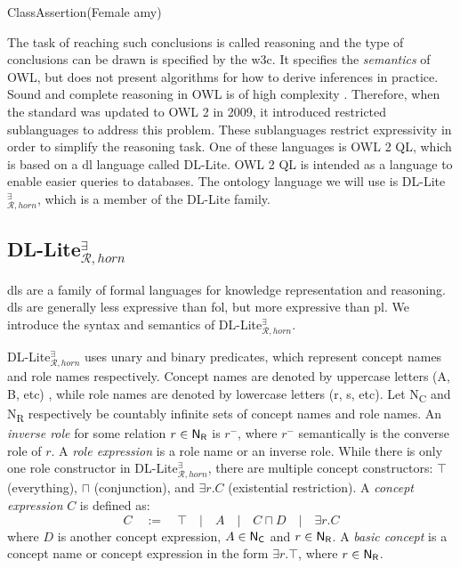 \centerline{\textsf{ClassAssertion(Female amy)}}
The task of reaching such conclusions is called reasoning and the type of conclusions can be drawn is specified by the \gls{w3c}. It specifies the \emph{semantics} of OWL, but does not present algorithms for how to derive inferences in practice. Sound and complete reasoning in OWL is of high complexity \cite{Krotzsch2012}. Therefore, when the standard was updated to OWL 2 in 2009, it introduced restricted sublanguages to address this problem. These sublanguages restrict expressivity in order to simplify the reasoning task. One of these languages is OWL 2 QL, which is based on a \gls{dl} language called DL-Lite. OWL 2 QL is intended as a language to enable easier queries to databases. The ontology language we will use is DL-Lite$_{\mathcal{R}, horn}^{\exists}$, which is a member of the DL-Lite family.

\subsection{DL-Lite$_{\mathcal{R}, horn}^{\exists}$}
\glspl{dl} are a family of formal languages for knowledge representation and reasoning. \glspl{dl} are generally less expressive than \gls{fol}, but more expressive than \gls{pl}. We introduce the syntax and semantics of  DL-Lite$_{\mathcal{R}, horn}^{\exists}$.

DL-Lite$_{\mathcal{R}, horn}^{\exists}$ uses unary and binary predicates, which represent concept names and role names respectively. Concept names are denoted by uppercase letters (A, B, etc) , while role names are denoted by lowercase letters (r, s, etc). Let \textsf{N\textsubscript{C}} and \textsf{N\textsubscript{R}} respectively be countably infinite sets of concept names and role names. An \emph{inverse role} for some relation $r \in \textsf{N\textsubscript{R}}$ is $r^-$, where $r^-$ semantically is the converse role of $r$. A \emph{role expression} is a role name or an inverse role. While there is only one role constructor in DL-Lite$_{\mathcal{R}, horn}^{\exists}$, there are multiple concept constructors: $\top$ (everything), $\sqcap$ (conjunction), and $\exists r.C$ (existential restriction). A \emph{concept expression} $C$ is defined as:
\[C \quad:=\quad \top\quad|\quad A \quad|\quad C\sqcap D\quad |\quad \exists r.C\]
where $D$ is another concept expression, $A\in \textsf{N\textsubscript{C}}$ and $r \in \textsf{N\textsubscript{R}}$. A \emph{basic concept} is a concept name or concept expression in the form $\exists r.\top$, where $r \in \textsf{N\textsubscript{R}}$. 

